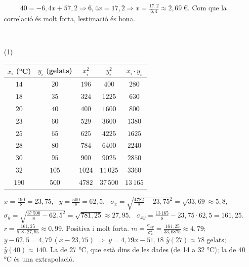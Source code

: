 \documentclass[11pt,a4paper]{article}
\newcommand{\estrelles}[1]{{\color{accent}\ifcase#1\or\faStar\faStar[regular]\faStar[regular]\or\faStar\faStar\faStar[regular]\or\faStar\faStar\faStar\fi}}
\newcounter{exer}
\newcommand{\ex}[1]{\par\needspace{4\baselineskip}\medskip\stepcounter{exer}\noindent{\color{navy}\bfseries\theexer.}\ \ {\small\estrelles{#1}}\ \ }
\newcommand{\res}[1]{\boxed{#1}}\newcommand{\rest}[1]{\fbox{#1}}
\begin{document}
\ex{2} $40=-6{,}4x+57{,}2\Rightarrow6{,}4x=17{,}2\Rightarrow x=\frac{17{,}2}{6{,}4}\approx\res{2{,}69\ \text{€}}$. Com que la correlació és molt forta, l\textquotesingle estimació és bona.

\ex{3} \begin{tasks}(1)
  \task \par\smallskip\begin{center}{\renewcommand{\arraystretch}{1.15}\small\begin{tabular}{|c|c|c|c|c|}\hline $x_i$ (°C) & $y_i$ (gelats) & $x_i^2$ & $y_i^2$ & $x_i\cdot y_i$\\\hline $14$ & $20$ & $196$ & $400$ & $280$\\ $18$ & $35$ & $324$ & $1225$ & $630$\\ $20$ & $40$ & $400$ & $1600$ & $800$\\ $23$ & $60$ & $529$ & $3600$ & $1380$\\ $25$ & $65$ & $625$ & $4225$ & $1625$\\ $28$ & $80$ & $784$ & $6400$ & $2240$\\ $30$ & $95$ & $900$ & $9025$ & $2850$\\ $32$ & $105$ & $1024$ & $11\,025$ & $3360$\\\hline $190$ & $500$ & $4782$ & $37\,500$ & $13\,165$\\\hline\end{tabular}}\end{center}$\bar x=\frac{190}{8}=23{,}75$, \ $\bar y=\frac{500}{8}=62{,}5$. \ $\sigma_x=\sqrt{\frac{4782}{8}-23{,}75^2}=\sqrt{33{,}69}\approx 5{,}8$, \ $\sigma_y=\sqrt{\frac{37\,500}{8}-62{,}5^2}=\sqrt{781{,}25}\approx 27{,}95$. \ $\sigma_{xy}=\frac{13\,165}{8}-23{,}75\cdot 62{,}5=161{,}25$. \ $r=\frac{161{,}25}{5{,}8\cdot 27{,}95}\approx\res{0{,}99}$. Positiva i molt forta.
  \task $m=\frac{\sigma_{xy}}{\sigma_x^2}=\frac{161{,}25}{33{,}6875}\approx 4{,}79$; \ $y-62{,}5=4{,}79\,(x-23{,}75)\ \Rightarrow\ \res{y=4{,}79x-51{,}18}$
  \task $\hat y(27)\approx\res{78}$ gelats; \ $\hat y(40)\approx\res{140}$. La de 27 °C, que està dins de les dades (de 14 a 32 °C); la de 40 °C és una extrapolació.\par\smallskip\begin{center}
\end{center}
\end{tasks}
\end{document}
